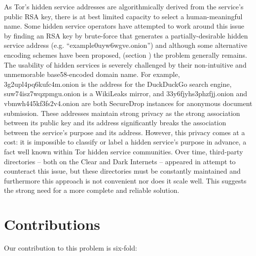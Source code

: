 As Tor's hidden service addresses are algorithmically derived from the service's public RSA key, there is at best limited capacity to select a human-meaningful name. Some hidden service operators have attempted to work around this issue by finding an RSA key by brute-force that generates a partially-desirable hidden service address (e.g. ``example0uyw6wgve.onion'') and although some alternative encoding schemes have been proposed, (section \label{sec:EncodingSchemes}) the problem generally remains. The usability of hidden services is severely challenged by their non-intuitive and unmemorable base58-encoded domain name. For example, 3g2upl4pq6kufc4m.onion is the address for the DuckDuckGo search engine, \\ suw74isz7wqzpmgu.onion is a WikiLeaks mirror, and 33y6fjyhs3phzfjj.onion and \\ vbmwh445kf3fs2v4.onion are both SecureDrop instances for anonymous document submission. These addresses maintain strong privacy as the strong association between its public key and its address significantly breaks the association between the service's purpose and its address. However, this privacy comes at a cost: it is impossible to classify or label a hidden service's purpose in advance, a fact well known within Tor hidden service communities. Over time, third-party directories -- both on the Clear and Dark Internets -- appeared in attempt to counteract this issue, but these directories must be constantly maintained and furthermore this approach is not convenient nor does it scale well. This suggests the strong need for a more complete and reliable solution.

\section{Contributions}

Our contribution to this problem is six-fold:

